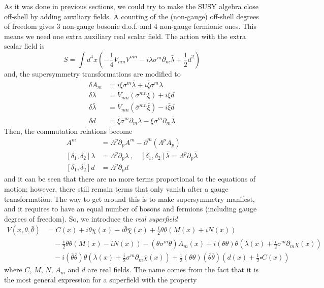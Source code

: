 \documentclass[a4paper,12pt]{article}
\numberwithin{equation}{section}
\numberwithin{exe}{section}
\newcommand{\p}{{\partial}}
\renewcommand{\d}{{\delta}}
\renewcommand{\l}{{\lambda}}
\newcommand{\lb}{{\bar\lambda}}
\renewcommand{\L}{{\Lambda}}
\newcommand{\s}{{\sigma}}
\renewcommand{\sb}{{\bar\sigma}}
\renewcommand{\t}{{\theta}}
\newcommand{\tb}{{\bar\theta}}
\newcommand{\xib}{{\bar\xi}}
\newcommand{\chib}{{\bar\chi}}
\begin{document}
As it was done in previous sections, we could try to make the SUSY algebra close off-shell by adding auxiliary fields. A counting of the (non-gauge) off-shell degrees of freedom gives 3 non-gauge bosonic d.o.f. and 4 non-gauge fermionic ones. This means we need one extra auxiliary real scalar field. The action with the extra scalar field is
	\begin{equation}
	S = \int d^4 x \left( -\frac14 V_{mn} V^{mn} -i\l\s^m\p_m\lb + \frac12 d^2\right)
	\end{equation}
and, the supersymmetry transformations are modified to
	\begin{equation}
		\begin{aligned}
		\d A_m & = i\xi \s^m \lb + i\xib\s^m\l \\
		\d \l & = V_{mn}(\s^{mn}\xi) + i\xi d \\
		\d \lb & = V_{mn}(\sb^{mn}\xib) - i\xib d \\
		\d d & = \xib\sb^m\p_m\l - \xi\s^m\p_m\lb
		\end{aligned}
	\end{equation}
Then, the commutation relations become
	\begin{align}
		[\d_1,\d_2] A^m & = \L^p\p_p A^m - \p^m(\L^p A_p) \nonumber \\
		[\d_1, \d_2] \l & = \L^p\p_p \l\ ,\quad [\d_1, \d_2]\lb = \L^p\p_p\lb \\
		[\d_1, \d_2]d & = \L^p \p_p d \nonumber
	\end{align}
and it can be seen that there are no more terms proportional to the equations of motion; however, there still remain terms that only vanish after a gauge transformation. The way to get around this is to make supersymmetry manifest, and it requires to have an equal number of bosons and fermions (including gauge degrees of freedom). So, we introduce the {\it real superfield}
	\begin{equation}
		\begin{aligned}
		V(x,\t,\tb) & = C(x) + i\t\chi(x) - i\tb\chib(x) + \frac{i}{2}\t\t(M(x) + iN(x)) \\
		& \quad -\frac{i}{2} \tb\tb (M(x) - i N(x)) - (\t\s^m\tb) A_m(x) + i(\t\t) \tb (\lb(x) + \frac{i}{2}\sb^m\p_m\chi(x)) \\
		& \quad -i(\tb\tb)\t(\l(x) + \frac{i}{2}\s^m\p_m\chib(x)) + \frac12 (\t\t)(\tb\tb)(d(x) +\frac12\square C(x))
		\end{aligned}
	\end{equation}
where $C$, $M$, $N$, $A_m$ and $d$ are real fields. The name comes from the fact that it is the most general expression for a superfield with the property
\end{document}
